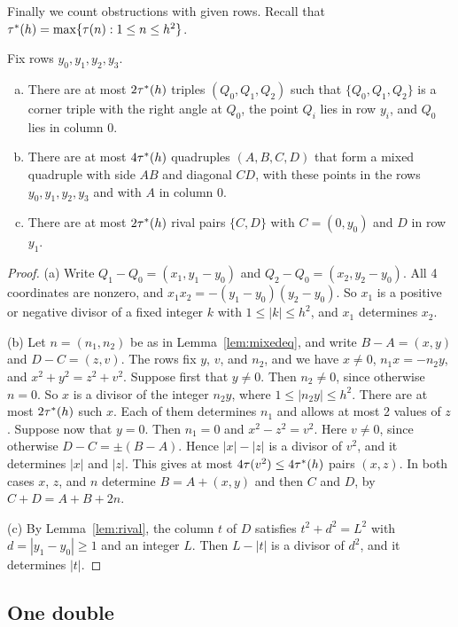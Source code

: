 Finally we count obstructions with given rows. Recall that
${\tau^*}(h)=\max\{\tau(n):1\le n\le h^2\}$.

\begin{lemma}[counting]\label{lem:count}
Fix rows $y_0,y_1,y_2,y_3$.
\begin{enumerate}[(a)]
\item There are at most $2{\tau^*}(h)$ triples $(Q_0,Q_1,Q_2)$ such that $\{Q_0,Q_1,Q_2\}$ is a
corner triple with the right angle at $Q_0$, the point $Q_i$ lies in row $y_i$, and $Q_0$
lies in column $0$.
\item There are at most $4{\tau^*}(h)$ quadruples $(A,B,C,D)$ that form a mixed quadruple with
side $AB$ and diagonal $CD$, with these points in the rows $y_0,y_1,y_2,y_3$ and with $A$
in column $0$.
\item There are at most $2{\tau^*}(h)$ rival pairs $\{C,D\}$ with $C=(0,y_0)$ and $D$ in row
$y_1$.
\end{enumerate}
\end{lemma}

\begin{proof}
(a) Write $Q_1-Q_0=(x_1,y_1-y_0)$ and $Q_2-Q_0=(x_2,y_2-y_0)$. All 4 coordinates are
nonzero, and $x_1x_2=-(y_1-y_0)(y_2-y_0)$. So $x_1$ is a positive or negative divisor of a
fixed integer $k$ with $1\le|k|\le h^2$, and $x_1$ determines $x_2$.

(b) Let $n=(n_1,n_2)$ be as in Lemma~\ref{lem:mixedeq}, and write $B-A=(x,y)$ and
$D-C=(z,v)$. The rows fix $y$, $v$, and $n_2$, and we have $x\ne0$, $n_1x=-n_2y$, and
$x^2+y^2=z^2+v^2$. Suppose first that $y\ne0$. Then $n_2\ne0$, since otherwise $n=0$. So $x$
is a divisor of the integer $n_2y$, where $1\le|n_2y|\le h^2$. There are at most
$2{\tau^*}(h)$ such $x$. Each of them determines $n_1$ and allows at most 2 values of $z$.
Suppose now that $y=0$. Then $n_1=0$ and $x^2-z^2=v^2$. Here $v\ne0$, since otherwise
$D-C=\pm(B-A)$. Hence $|x|-|z|$ is a divisor of $v^2$, and it determines $|x|$ and $|z|$.
This gives at most $4\tau(v^2)\le4{\tau^*}(h)$ pairs $(x,z)$. In both cases $x$, $z$, and $n$
determine $B=A+(x,y)$ and then $C$ and $D$, by $C+D=A+B+2n$.

(c) By Lemma~\ref{lem:rival}, the column $t$ of $D$ satisfies $t^2+d^2=L^2$ with
$d=|y_1-y_0|\ge1$ and an integer $L$. Then $L-|t|$ is a divisor of $d^2$, and it
determines $|t|$.
\end{proof}

\subsection{One double}

